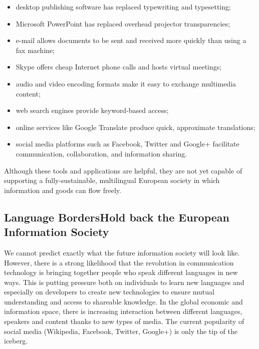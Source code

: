 \begin{multicols}{2}
  \begin{itemize}
  \item desktop publishing software has replaced typewriting and typesetting;
  \item Microsoft PowerPoint has replaced overhead projector transparencies;
  \item e-mail allows documents to be sent and received more quickly than using a fax machine;
  \item Skype offers cheap Internet phone calls and hosts virtual meetings;
  \item audio and video encoding formats make it easy to exchange multimedia content;
  \item web search engines provide keyword-based access;
  \item online services like Google Translate produce quick, approximate translations;
  \item social media platforms such as Facebook, Twitter and Google+ facilitate communication, collaboration, and information sharing.
  \end{itemize}

  Although these tools and applications are helpful, they are not yet capable of supporting a fully-sustainable, multilingual European society in which information and goods can flow freely.

  \subsection[Language Borders Hold back the European Information Society]{Language Borders\newline Hold back the European Information Society}

  We cannot predict exactly what the future information society will look like. However, there is a strong likelihood that the revolution in communication technology is bringing together people who speak different languages in new ways. This is putting pressure both on individuals to learn new languages and especially on developers to create new technologies to ensure mutual understanding and access to shareable knowledge. In the global economic and information space, there is increasing interaction between different languages, speakers and content thanks to new types of media. The current popularity of social media (Wikipedia, Facebook, Twitter, Google+) is only the tip of the iceberg.



\end{multicols}
